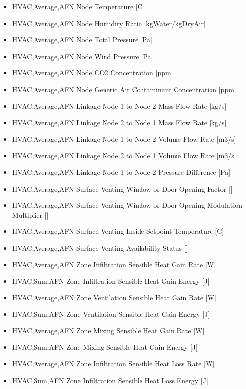 \begin{itemize}
\item
  HVAC,Average,AFN Node Temperature {[}C{]}
\item
  HVAC,Average,AFN Node Humidity Ratio {[}kgWater/kgDryAir{]}
\item
  HVAC,Average,AFN Node Total Pressure {[}Pa{]}
\item
  HVAC,Average,AFN Node Wind Pressure {[}Pa{]}
\item
  HVAC,Average,AFN Node CO2 Concentration {[}ppm{]}
\item
  HVAC,Average,AFN Node Generic Air Contaminant Concentration {[}ppm{]}
\item
  HVAC,Average,AFN Linkage Node 1 to Node 2 Mass Flow Rate {[}kg/s{]}
\item
  HVAC,Average,AFN Linkage Node 2 to Node 1 Mass Flow Rate {[}kg/s{]}
\item
  HVAC,Average,AFN Linkage Node 1 to Node 2 Volume Flow Rate {[}m3/s{]}
\item
  HVAC,Average,AFN Linkage Node 2 to Node 1 Volume Flow Rate {[}m3/s{]}
\item
  HVAC,Average,AFN Linkage Node 1 to Node 2 Pressure Difference {[}Pa{]}
\item
  HVAC,Average,AFN Surface Venting Window or Door Opening Factor {[]}
\item
  HVAC,Average,AFN Surface Venting Window or Door Opening Modulation Multiplier {[]}
\item
  HVAC,Average,AFN Surface Venting Inside Setpoint Temperature {[}C{]}
\item
  HVAC,Average,AFN Surface Venting Availability Status {[]}
\item
  HVAC,Average,AFN Zone Infiltration Sensible Heat Gain Rate {[}W{]}
\item
  HVAC,Sum,AFN Zone Infiltration Sensible Heat Gain Energy {[}J{]}
\item
  HVAC,Average,AFN Zone Ventilation Sensible Heat Gain Rate {[}W{]}
\item
  HVAC,Sum,AFN Zone Ventilation Sensible Heat Gain Energy {[}J{]}
\item
  HVAC,Average,AFN Zone Mixing Sensible Heat Gain Rate {[}W{]}
\item
  HVAC,Sum,AFN Zone Mixing Sensible Heat Gain Energy {[}J{]}
\item
  HVAC,Average,AFN Zone Infiltration Sensible Heat Loss Rate {[}W{]}
\item
  HVAC,Sum,AFN Zone Infiltration Sensible Heat Loss Energy {[}J{]}

\end{itemize}
